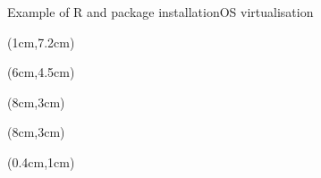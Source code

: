 \begin{frame}{Example of R and package installation}{OS virtualisation}
\begin{textblock*}{10cm}(1cm,7.2cm) %
\end{textblock*}
\begin{textblock*}{10cm}(6cm,4.5cm) %
\end{textblock*}
\begin{textblock*}{10cm}(8cm,3cm) %
\end{textblock*}
\begin{textblock*}{10cm}(8cm,3cm) %
\end{textblock*}
\begin{textblock*}{10cm}(0.4cm,1cm) %

\end{textblock*}
\end{frame}
